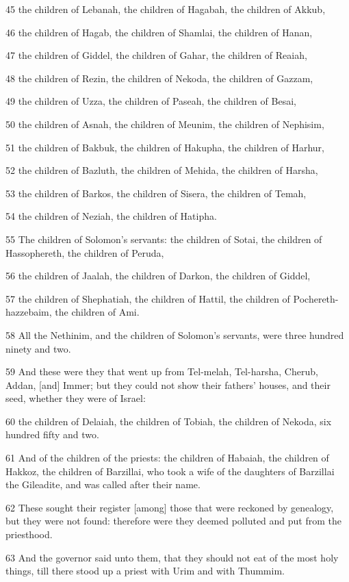 \par 45 the children of Lebanah, the children of Hagabah, the children of Akkub,
\par 46 the children of Hagab, the children of Shamlai, the children of Hanan,
\par 47 the children of Giddel, the children of Gahar, the children of Reaiah,
\par 48 the children of Rezin, the children of Nekoda, the children of Gazzam,
\par 49 the children of Uzza, the children of Paseah, the children of Besai,
\par 50 the children of Asnah, the children of Meunim, the children of Nephisim,
\par 51 the children of Bakbuk, the children of Hakupha, the children of Harhur,
\par 52 the children of Bazluth, the children of Mehida, the children of Harsha,
\par 53 the children of Barkos, the children of Sisera, the children of Temah,
\par 54 the children of Neziah, the children of Hatipha.
\par 55 The children of Solomon's servants: the children of Sotai, the children of Hassophereth, the children of Peruda,
\par 56 the children of Jaalah, the children of Darkon, the children of Giddel,
\par 57 the children of Shephatiah, the children of Hattil, the children of Pochereth-hazzebaim, the children of Ami.
\par 58 All the Nethinim, and the children of Solomon's servants, were three hundred ninety and two.
\par 59 And these were they that went up from Tel-melah, Tel-harsha, Cherub, Addan, [and] Immer; but they could not show their fathers' houses, and their seed, whether they were of Israel:
\par 60 the children of Delaiah, the children of Tobiah, the children of Nekoda, six hundred fifty and two.
\par 61 And of the children of the priests: the children of Habaiah, the children of Hakkoz, the children of Barzillai, who took a wife of the daughters of Barzillai the Gileadite, and was called after their name.
\par 62 These sought their register [among] those that were reckoned by genealogy, but they were not found: therefore were they deemed polluted and put from the priesthood.
\par 63 And the governor said unto them, that they should not eat of the most holy things, till there stood up a priest with Urim and with Thummim.

